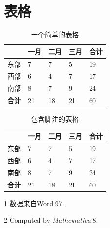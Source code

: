 \documentclass[
    doctor,
    pdflinks,
    ]{xjtuthesis}
\begin{document}
        \section{表格}

            \begin{table}[h!]
              \centering
              \caption{一个简单的表格}
              \label{tab:simple}
              \wuhao
              \begin{tabularx}{\linewidth}{XXXXX} \toprule 
                    & 一月 & 二月 & 三月 & 合计 \\ \midrule
               东部 &    7 &    7 &    5 &   19 \\ 
               西部 &    6 &    4 &    7 &   17 \\ 
               南部 &    8 &    7 &    9 &   24 \\ 
           \bf 合计 &   21 &   18 &   21 &   60 \\ \bottomrule
              \end{tabularx}
            \end{table}


            \begin{table}[h!]
              \begin{threeparttable}[h]
                \centering
                \caption{包含脚注的表格}
                \label{tab:with-footnote}
                \wuhao
                \begin{tabularx}{\linewidth}{XXXXX} \toprule 
                      & 一月 & 二月 & 三月 & 合计 \\ \midrule
                      东部 &    7\tnote{1}
                                    &    7 &    5 &   19 \\ 
                 西部 &    6 &    4 &    7 &   17 \\ 
                 南部 &    8 &    7 &    9 &   24 \\ 
                 \bf 合计\tnote{2}
                      &   21 &   18 &   21 &   60 \\ \bottomrule
                \end{tabularx}
              \begin{tablenotes}
              \item[1] 数据来自Word 97.
              \item[2] Computed by \textsl{Mathematica} 8.
              \end{tablenotes}
              \end{threeparttable}
            \end{table}
\end{document}
